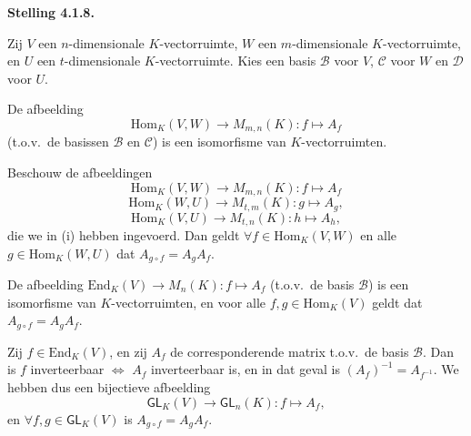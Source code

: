 \documentclass[10pt,a4paper]{article}
\newenvironment{res}[2]{%
  \par\noindent\textbf{#1 #2.}%
}{%
  \par\vspace{2pt}\normalfont
}
\begin{document}
\begin{res}{Stelling}{4.1.8}
Zij $V$ een $n$-dimensionale $K$-vectorruimte, $W$ een $m$-dimensionale $K$-vectorruimte, en $U$ een $t$-dimensionale $K$-vectorruimte. Kies een basis $\mathcal B$ voor $V$, $\mathcal C$ voor $W$ en $\mathcal D$ voor $U$.
\begin{myenum}
\item De afbeelding \[\mathrm{Hom}_K(V,W)\to M_{m,n}(K):f\mapsto A_f\] (t.o.v.\ de basissen $\mathcal B$ en $\mathcal C$) is een isomorfisme van $K$-vectorruimten.
\item Beschouw de afbeeldingen
\[
\mathrm{Hom}_K(V,W)\to M_{m,n}(K):f\mapsto A_f\] \[ \mathrm{Hom}_K(W,U)\to M_{t,m}(K):g\mapsto A_g,\] \[ \mathrm{Hom}_K(V,U)\to M_{t,n}(K):h\mapsto A_h,
\]
die we in (i) hebben ingevoerd. Dan geldt $\forall f\in\mathrm{Hom}_K(V,W)$ en alle $g\in\mathrm{Hom}_K(W,U)$ dat $A_{g\circ f}=A_gA_f$.
\item De afbeelding $\mathrm{End}_K(V)\to M_n(K):f\mapsto A_f$ (t.o.v.\ de basis $\mathcal B$) is een isomorfisme van $K$-vectorruimten, en voor alle $f,g\in\mathrm{Hom}_K(V)$ geldt dat $A_{g\circ f}=A_gA_f$.
\item Zij $f\in\mathrm{End}_K(V)$, en zij $A_f$ de corresponderende matrix t.o.v.\ de basis $\mathcal B$. Dan is $f$ inverteerbaar \(\iff\) $A_f$ inverteerbaar is, en in dat geval is $(A_f)^{-1}=A_{f^{-1}}$. We hebben dus een bijectieve afbeelding \[\mathsf{GL}_K(V)\to \mathsf{GL}_n(K):f\mapsto A_f,\] en  $\forall f,g\in \mathsf{GL}_K(V)$ is $A_{g\circ f}=A_gA_f$.
\end{myenum}
\end{res}
\end{document}
